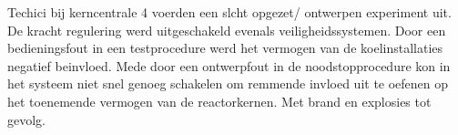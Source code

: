 \documentclass{article}
\begin{document}
	Techici bij kerncentrale 4 voerden een slcht opgezet/ ontwerpen experiment uit. De  kracht regulering werd uitgeschakeld evenals veiligheidssystemen. 
	Door een bedieningsfout in een testprocedure werd het vermogen van de koelinstallaties negatief beinvloed. Mede door een ontwerpfout in de noodstopprocedure kon in het systeem niet snel genoeg schakelen om remmende invloed uit te oefenen op het toenemende vermogen van de reactorkernen. Met brand en explosies tot gevolg.
	\cite{rivmTjernobyl}
	\cite{andereTijdenTjernobyl}
	\cite{kingskey19042022tjernobyl}
	\cite{erikbork26042023reactor4}
	\cite{nosTjernobyl30jaarlater}
\end{document}
